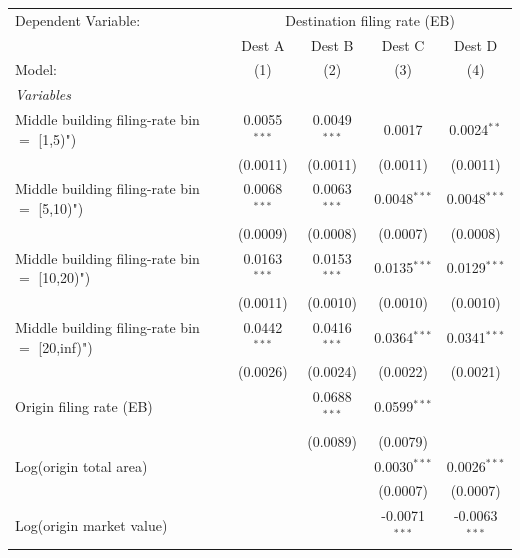 \begingroup
\centering
\begin{tabular}{lcccc}
   \tabularnewline \midrule \midrule
   Dependent Variable: & \multicolumn{4}{c}{Destination filing rate (EB)}\\
                                                  & Dest A         & Dest B         & Dest C          & Dest D \\   
   Model:                                         & (1)            & (2)            & (3)             & (4)\\  
   \midrule
   \emph{Variables}\\
   Middle building filing-rate bin $=$ [1,5)")    & 0.0055$^{***}$ & 0.0049$^{***}$ & 0.0017          & 0.0024$^{**}$\\   
                                                  & (0.0011)       & (0.0011)       & (0.0011)        & (0.0011)\\   
   Middle building filing-rate bin $=$ [5,10)")   & 0.0068$^{***}$ & 0.0063$^{***}$ & 0.0048$^{***}$  & 0.0048$^{***}$\\   
                                                  & (0.0009)       & (0.0008)       & (0.0007)        & (0.0008)\\   
   Middle building filing-rate bin $=$ [10,20)")  & 0.0163$^{***}$ & 0.0153$^{***}$ & 0.0135$^{***}$  & 0.0129$^{***}$\\   
                                                  & (0.0011)       & (0.0010)       & (0.0010)        & (0.0010)\\   
   Middle building filing-rate bin $=$ [20,inf)") & 0.0442$^{***}$ & 0.0416$^{***}$ & 0.0364$^{***}$  & 0.0341$^{***}$\\   
                                                  & (0.0026)       & (0.0024)       & (0.0022)        & (0.0021)\\   
   Origin filing rate (EB)                        &                & 0.0688$^{***}$ & 0.0599$^{***}$  &   \\   
                                                  &                & (0.0089)       & (0.0079)        &   \\   
   Log(origin total area)                         &                &                & 0.0030$^{***}$  & 0.0026$^{***}$\\   
                                                  &                &                & (0.0007)        & (0.0007)\\   
   Log(origin market value)                       &                &                & -0.0071$^{***}$ & -0.0063$^{***}$\\   

\end{tabular}
